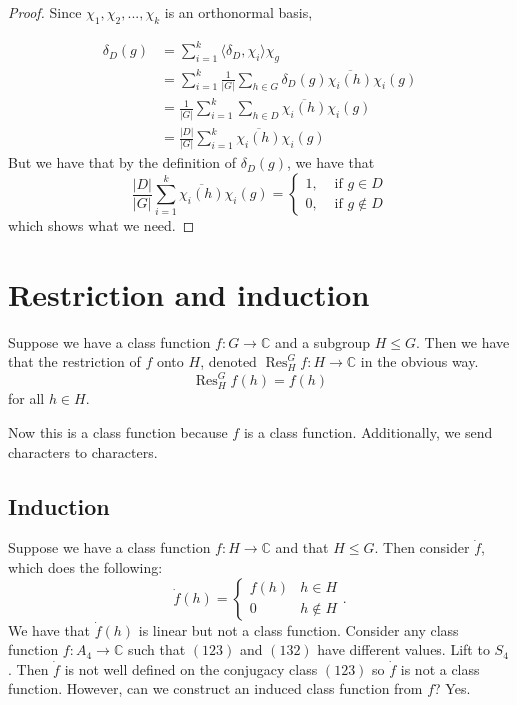 \documentclass[]{report}
\theoremstyle{definition}
\numberwithin{theorem}{section}
\numberwithin{equation}{section}
\newcommand{\res}{\operatorname{Res}}
\begin{document}
\begin{proof}
	Since $\chi_1, \chi_2, ..., \chi_k$ is an orthonormal basis,
	
	\begin{align*}
		\delta_D(g) &= \sum_{i = 1}^k \langle \delta_D, \chi_i \rangle \chi_g\\
		&= \sum_{i = 1}^k \frac{1}{|G|} \sum_{h \in G} \delta_D(g) \overline{\chi_i(h)} \chi_i(g)\\
		&= \frac{1}{|G|}\sum_{i = 1}^k \sum_{h \in D} \overline{\chi_i(h)} \chi_i(g)\\
		&= \frac{|D|}{|G|}\sum_{i = 1}^k \overline{\chi_i(h)} \chi_i(g)
	\end{align*}
	But we have that by the definition of $\delta_D(g)$, we have that 
	\begin{equation}
		\frac{|D|}{|G|}\sum_{i = 1}^k \overline{\chi_i(h)} \chi_i(g) = \begin{cases}
			1, & \text{ if } g \in D\\
			0, & \text{ if } g \notin D
		\end{cases}
	\end{equation}
	which shows what we need. 
\end{proof}


\section{Restriction and induction}

Suppose we have a class function $f: G \rightarrow \mathbb{C}$ and a subgroup $H \leq G$. Then we have that the restriction of $f$ onto $H$, denoted $\res^G_H f : H \rightarrow \mathbb{C}$ in the obvious way. 
\begin{equation}
	\res^G_H f(h) = f(h)
\end{equation}
for all $h \in H$. 

Now this is a class function because $f$ is a class function. Additionally, we send characters to characters. 
\subsection{Induction}
Suppose we have a class function $f: H \rightarrow \mathbb{C}$ and that $H \leq G$. Then consider $\dot{f}$, which does the following:
\begin{equation}
	\dot{f}(h) =
	\begin{cases}
		f(h) & h \in H\\
		0 & h \notin H
	\end{cases}.
\end{equation}
We have that $\dot{f}(h)$ is linear but not a class function.
Consider any class function $f: A_4 \rightarrow \mathbb{C}$ such that $(123)$ and $(132)$ have different values. Lift to $S_4$. Then $\dot{f}$ is not well defined on the conjugacy class $(123)$ so $\dot{f}$ is not a class function.
However, can we construct an induced class function from $f$? Yes. 
\end{document}

